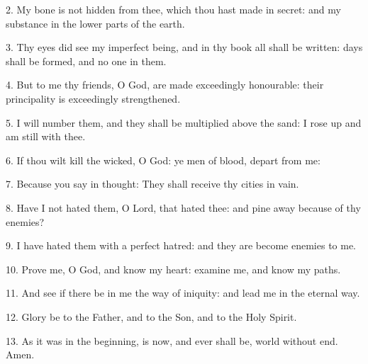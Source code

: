 2. My bone is not hidden from thee, which thou hast made in secret: and my substance in the lower parts of the earth.
 	
3. Thy eyes did see my imperfect being, and in thy book all shall be written: days shall be formed, and no one in them.
 	
4.  But to me thy friends, O God, are made exceedingly honourable: their principality is exceedingly strengthened.
 	
5.  I will number them, and they shall be multiplied above the sand: I rose up and am still with thee.
 	
6. If thou wilt kill the wicked, O God: ye men of blood, depart from me:
 	
7. Because you say in thought: They shall receive thy cities in vain.
 	
8. Have I not hated them, O Lord, that hated thee: and pine away because of thy enemies?

9. I have hated them with a perfect hatred: and they are become enemies to me.
 	
10. Prove me, O God, and know my heart: examine me, and know my paths.
 	
11. And see if there be in me the way of iniquity: and lead me in the eternal way.	
 	
12. Glory be to the Father, and to the Son, and to the Holy Spirit.
 	
13. As it was in the beginning, is now, and ever shall be, world without end. Amen.
